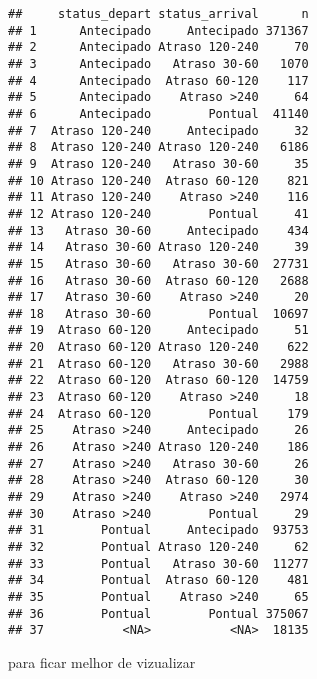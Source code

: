 \documentclass[
]{article}
\begin{document}
\begin{verbatim}
##     status_depart status_arrival      n
## 1      Antecipado     Antecipado 371367
## 2      Antecipado Atraso 120-240     70
## 3      Antecipado   Atraso 30-60   1070
## 4      Antecipado  Atraso 60-120    117
## 5      Antecipado    Atraso >240     64
## 6      Antecipado        Pontual  41140
## 7  Atraso 120-240     Antecipado     32
## 8  Atraso 120-240 Atraso 120-240   6186
## 9  Atraso 120-240   Atraso 30-60     35
## 10 Atraso 120-240  Atraso 60-120    821
## 11 Atraso 120-240    Atraso >240    116
## 12 Atraso 120-240        Pontual     41
## 13   Atraso 30-60     Antecipado    434
## 14   Atraso 30-60 Atraso 120-240     39
## 15   Atraso 30-60   Atraso 30-60  27731
## 16   Atraso 30-60  Atraso 60-120   2688
## 17   Atraso 30-60    Atraso >240     20
## 18   Atraso 30-60        Pontual  10697
## 19  Atraso 60-120     Antecipado     51
## 20  Atraso 60-120 Atraso 120-240    622
## 21  Atraso 60-120   Atraso 30-60   2988
## 22  Atraso 60-120  Atraso 60-120  14759
## 23  Atraso 60-120    Atraso >240     18
## 24  Atraso 60-120        Pontual    179
## 25    Atraso >240     Antecipado     26
## 26    Atraso >240 Atraso 120-240    186
## 27    Atraso >240   Atraso 30-60     26
## 28    Atraso >240  Atraso 60-120     30
## 29    Atraso >240    Atraso >240   2974
## 30    Atraso >240        Pontual     29
## 31        Pontual     Antecipado  93753
## 32        Pontual Atraso 120-240     62
## 33        Pontual   Atraso 30-60  11277
## 34        Pontual  Atraso 60-120    481
## 35        Pontual    Atraso >240     65
## 36        Pontual        Pontual 375067
## 37           <NA>           <NA>  18135
\end{verbatim}

para ficar melhor de vizualizar
\end{document}
